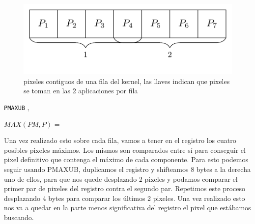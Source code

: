 \begin{figure}[H]
	\centering
	\includegraphics{img/max/filaKernel.pdf}
	\caption{pixeles contiguos de una fila del kernel, las llaves indican que pixeles se toman en las 2 aplicaciones por fila}
\end{figure}

\begin{center}

	 

	 

	\texttt{PMAXUB} ,  \hfill

	 

	$MAX(PM,P)$ = 
\end{center}

Una vez realizado esto sobre cada fila, vamos a tener en el registro los cuatro posibles pixeles máximos. Los mismos son comparados entre sí para conseguir el pixel definitivo que contenga el máximo de cada componente. Para esto podemos seguir usando PMAXUB, duplicamos el registro y shifteamos 8 bytes a la derecha uno de ellos, para que nos quede desplazado 2 pixeles y podamos comparar el primer par de pixeles del registro contra el segundo par. Repetimos este proceso desplazando 4 bytes para comparar los últimos 2 pixeles. Una vez realizado esto nos va a quedar en la parte menos significativa del registro el pixel que estábamos buscando.

